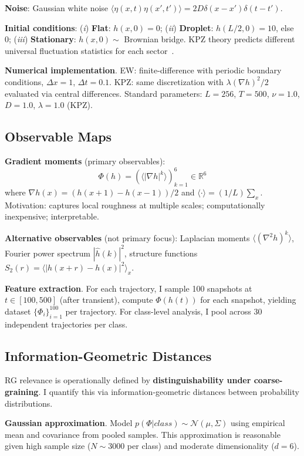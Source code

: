 \documentclass[aps,pre,reprint,amsmath,amssymb,superscriptaddress]{revtex4-2}
\newcommand{\bbR}{\mathbb{R}}
\begin{document}
\textbf{Noise}: Gaussian white noise $\langle \eta(x,t) \eta(x',t') \rangle = 2D \delta(x-x') \delta(t-t')$.

\textbf{Initial conditions}: (\textit{i}) \textbf{Flat}: $h(x,0) = 0$; (\textit{ii}) \textbf{Droplet}: $h(L/2,0) = 10$, else 0; (\textit{iii}) \textbf{Stationary}: $h(x,0) \sim$ Brownian bridge. KPZ theory predicts different universal fluctuation statistics for each sector~\cite{Ferrari2011}.

\textbf{Numerical implementation}. EW: finite-difference with periodic boundary conditions, $\Delta x = 1$, $\Delta t = 0.1$. KPZ: same discretization with $\lambda(\nabla h)^2/2$ evaluated via central differences. Standard parameters: $L=256$, $T=500$, $\nu=1.0$, $D=1.0$, $\lambda=1.0$ (KPZ).

\subsection{Observable Maps}

\textbf{Gradient moments} (primary observables):
\begin{equation}
\Phi(h) = \left( \langle |\nabla h|^k \rangle \right)_{k=1}^6 \in \bbR^6
\label{eq:gradient-moments}
\end{equation}
where $\nabla h(x) = (h(x+1) - h(x-1))/2$ and $\langle \cdot \rangle = (1/L)\sum_x$. Motivation: captures local roughness at multiple scales; computationally inexpensive; interpretable.

\textbf{Alternative observables} (not primary focus): Laplacian moments $\langle (\nabla^2 h)^k \rangle$, Fourier power spectrum $|\hat{h}(k)|^2$, structure functions $S_2(r) = \langle |h(x+r)-h(x)|^2 \rangle_x$.

\textbf{Feature extraction}. For each trajectory, I sample 100 snapshots at $t \in [100, 500]$ (after transient), compute $\Phi(h(t))$ for each snapshot, yielding dataset $\{\Phi_i\}_{i=1}^{100}$ per trajectory. For class-level analysis, I pool across 30 independent trajectories per class.

\subsection{Information-Geometric Distances}

RG relevance is operationally defined by \textbf{distinguishability under coarse-graining}. I quantify this via information-geometric distances between probability distributions.

\textbf{Gaussian approximation}. Model $p(\Phi | class) \sim \mathcal{N}(\mu, \Sigma)$ using empirical mean and covariance from pooled samples. This approximation is reasonable given high sample size ($N \sim 3000$ per class) and moderate dimensionality ($d=6$).
\end{document}
